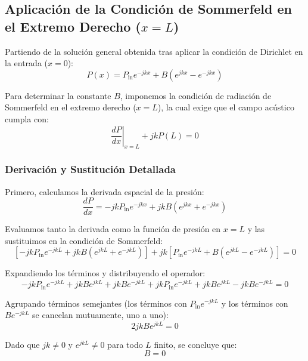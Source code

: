 \documentclass[11pt,letterpaper]{article}
\begin{document}
\subsection{Aplicación de la Condición de Sommerfeld en el Extremo Derecho ($x = L$)}\label{sec:sommerfeld-caso1}

Partiendo de la solución general obtenida tras aplicar la condición de Dirichlet en la entrada ($x = 0$):
\begin{equation}
    P(x) = P_{\text{in}} e^{-jkx} + B(e^{jkx} - e^{-jkx})
\end{equation}

Para determinar la constante $B$, imponemos la condición de radiación de Sommerfeld en el extremo derecho ($x = L$), la cual exige que el campo acústico cumpla con:
\begin{equation}
    \left. \frac{dP}{dx} \right|_{x=L} + jk P(L) = 0
\end{equation}

\subsubsection{Derivación y Sustitución Detallada}
Primero, calculamos la derivada espacial de la presión:
\begin{equation}
    \frac{dP}{dx} = -jk P_{\text{in}} e^{-jkx} + jk B (e^{jkx} + e^{-jkx})
\end{equation}

Evaluamos tanto la derivada como la función de presión en $x = L$ y las sustituimos en la condición de Sommerfeld:
\begin{equation}
    \left[ -jk P_{\text{in}} e^{-jkL} + jk B(e^{jkL} + e^{-jkL}) \right] + jk \left[ P_{\text{in}} e^{-jkL} + B(e^{jkL} - e^{-jkL}) \right] = 0
\end{equation}

Expandiendo los términos y distribuyendo el operador:
\begin{equation}
    -jk P_{\text{in}} e^{-jkL} + jk B e^{jkL} + jk B e^{-jkL} + jk P_{\text{in}} e^{-jkL} + jk B e^{jkL} - jk B e^{-jkL} = 0
\end{equation}

Agrupando términos semejantes (los términos con $P_{\text{in}} e^{-jkL}$ y los términos con $B e^{-jkL}$ se cancelan mutuamente, uno a uno):
\begin{equation}
    2jk B e^{jkL} = 0
\end{equation}

Dado que $jk \neq 0$ y $e^{jkL} \neq 0$ para todo $L$ finito, se concluye que:
\begin{equation}
    B = 0
\end{equation}
\end{document}
